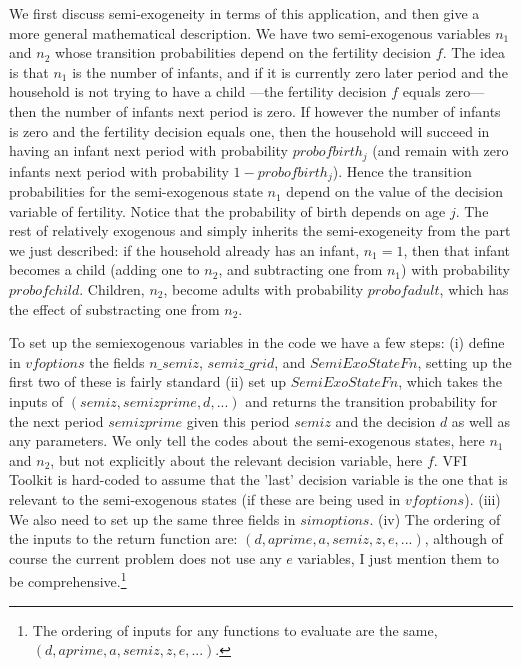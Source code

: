 We first discuss semi-exogeneity in terms of this application, and then give a more general mathematical description. We have two semi-exogenous variables $n_1$ and $n_2$ whose transition probabilities depend on the fertility decision $f$. The idea is that $n_1$ is the number of infants, and if it is currently zero later period and the household is not trying to have a child ---the fertility decision $f$ equals zero--- then the number of infants next period is zero. If however the number of infants is zero and the fertility decision equals one, then the household will succeed in having an infant next period with probability $probofbirth_j$ (and remain with zero infants next period with probability $1-probofbirth_j$). Hence the transition probabilities for the semi-exogenous state $n_1$ depend on the value of the decision variable of fertility. Notice that the probability of birth depends on age $j$. The rest of relatively exogenous and simply inherits the semi-exogeneity from the part we just described: if the household already has an infant, $n_1=1$, then that infant becomes a child (adding one to $n_2$, and subtracting one from $n_1$) with probability $probofchild$. Children, $n_2$, become adults with probability $probofadult$, which has the effect of substracting one from $n_2$.

To set up the semiexogenous variables in the code we have a few steps: (i) define in $vfoptions$ the fields $n\_{}semiz$, $semiz\_{}grid$, and $SemiExoStateFn$, setting up the first two of these is fairly standard (ii) set up $SemiExoStateFn$, which takes the inputs of $(semiz,semizprime,d,...)$ and returns the transition probability for the next period $semizprime$ given this period $semiz$ and the decision $d$ as well as any parameters. We only tell the codes about the semi-exogenous states, here $n_1$ and $n_2$, but not explicitly about the relevant decision variable, here $f$. VFI Toolkit is hard-coded to assume that the 'last' decision variable is the one that is relevant to the semi-exogenous states (if these are being used in $vfoptions$). (iii) We also need to set up the same three fields in $simoptions$.  (iv) The ordering of the inputs to the return function are: $(d,aprime,a,semiz,z,e,...)$, although of course the current problem does not use any $e$ variables, I just mention them to be comprehensive.\footnote{The ordering of inputs for any functions to evaluate are the same, $(d,aprime,a,semiz,z,e,...)$.}

